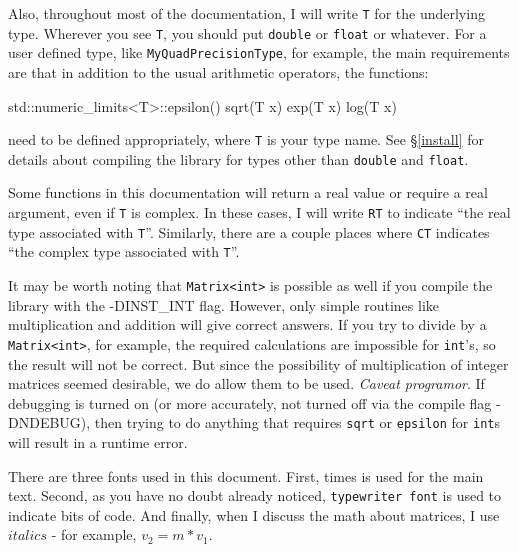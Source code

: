 \documentclass[twoside,letterpaper,11pt]{article}
\renewcommand{\tt}[1]{{\lstinline {#1}}}
\begin{document}
Also, throughout most of the documentation, I will write \tt{T} for the underlying type.
Wherever you see \tt{T}, you should put \tt{double} or \tt{float} or whatever.
For a user defined type, like \tt{MyQuadPrecisionType}, for example, the main requirements are that 
in addition to the usual arithmetic operators, the functions:
\begin{tmvcode}
std::numeric_limits<T>::epsilon()
sqrt(T x) 
exp(T x) 
log(T x)
\end{tmvcode}
need to be defined appropriately, where \tt{T} is your type name.  See \S\ref{install} for details about
compiling the library for types other than \tt{double} and \tt{float}.

Some functions in this documentation will return a real value or require a real argument, 
even if \tt{T} is complex.  In these cases, I will write \tt{RT} to indicate 
``the real type associated with \tt{T}''.  Similarly, there are a couple places where \tt{CT}
indicates ``the complex type associated with \tt{T}''.

It may be worth noting that \tt{Matrix<int>} is possible as well if you compile the library
with the -DINST\_INT flag. 
However, only simple 
routines like multiplication and addition will give correct answers.  If you try to 
divide by a \tt{Matrix<int>}, for example, the required calculations are impossible 
for \tt{int}'s,
so the result will not be correct.  But since the possibility of multiplication of 
integer matrices seemed desirable, we do allow them to be used.  
\emph{Caveat programor}.  If debugging is turned on (or more accurately, not
turned off via the compile flag -DNDEBUG), then trying to do anything that requires
\tt{sqrt} or \tt{epsilon} for \tt{int}s will result in a runtime error.

There are three fonts used in this document.  First, times is used for the main text.  
Second, as you have no doubt already noticed, \tt{typewriter font} is used to 
indicate bits of code.  And finally, when I discuss the math about matrices, I 
use $italics$ - for example, $v_2 = m * v_1$.
\end{document}
